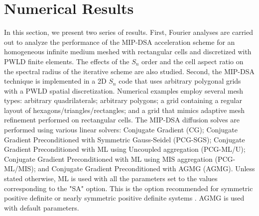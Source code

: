 \documentclass[preprint,10pt]{elsarticle}
\renewcommand{\(}{\left(}
\renewcommand{\)}{\right)}
\renewcommand{\[}{\left[}
\renewcommand{\]}{\right]}
\newcommand{\sn}{\ensuremath{S_n}\xspace}
\begin{document}

\section{Numerical Results} \label{sec_res}

In this section, we present two series of results. First, Fourier analyses are 
carried out to analyze the performance of the MIP-DSA acceleration scheme 
for an homogeneous infinite medium meshed with rectangular cells and discretized with PWLD finite elements.
The effects of the $S_n$ order and the cell aspect ratio on the spectral radius of the iterative 
scheme are also studied. Second, the MIP-DSA technique is implemented in a 2D \sn code that uses
arbitrary polygonal grids with a PWLD spatial discretization.  Numerical examples employ
several mesh types: arbitrary quadrilaterals; arbitrary polygons; a grid containing a regular layout of 
hexagons/triangles/rectangles; and a grid that mimics adaptive mesh refinement 
performed on rectangular cells. The MIP-DSA diffusion solves are performed using various
linear solvers: Conjugate Gradient (CG); Conjugate Gradient
Preconditioned with Symmetric Gauss-Seidel (PCG-SGS); Conjugate Gradient
Preconditioned with ML using Uncoupled aggregation (PCG-ML/U);
Conjugate Gradient Preconditioned with ML using MIS aggregation (PCG-ML/MIS);
and Conjugate Gradient Preconditioned with AGMG (AGMG). Unless stated otherwise, ML is
used with all the parameters set to the values corresponding to the "SA"
option. This is the option recommended for symmetric positive definite or nearly
symmetric positive definite systems \cite{ml_guide}. AGMG is used with default parameters.

\end{document}
